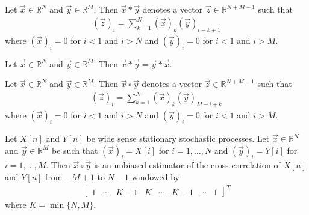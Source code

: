 \documentclass[a4paper, openany, oneside]{memoir}
\begin{document}
\begin{definition}[Convolution]
    Let $\vec{x} \in \mathbb{R}^N$ and $\vec{y} \in \mathbb{R}^M$. Then $\vec{x} \ast \vec{y}$ denotes a vector $\vec{z} \in \mathbb{R}^{N+M-1}$ such that
    \begin{align*}
        (\vec{z})_i = \sum_{k=1}^{N} (\vec{x})_k (\vec{y})_{i-k+1}
    \end{align*}
    where $(\vec{x})_i=0$ for $i < 1$ and $i > N$ and $(\vec{y})_i=0$ for $i < 1$ and $i > M$.
\end{definition}
\begin{theorem} \label{th:conv-comm}
    Let $\vec{x} \in \mathbb{R}^N$ and $\vec{y} \in \mathbb{R}^M$. Then $\vec{x} \ast \vec{y} = \vec{y} \ast \vec{x}$.
\end{theorem}
\begin{definition}
    Let $\vec{x} \in \mathbb{R}^N$ and $\vec{y} \in \mathbb{R}^M$. Then $\vec{x} \circ \vec{y}$ denotes a vector $\vec{z} \in \mathbb{R}^{N+M-1}$ such that
    \begin{align*}
        (\vec{z})_i = \sum_{k=1}^{N} (\vec{x})_k (\vec{y})_{M-i+k}
    \end{align*}
    where $(\vec{x})_i=0$ for $i < 1$ and $i > N$ and $(\vec{y})_i=0$ for $i < 1$ and $i > M$.
\end{definition}
\begin{theorem} \label{th:corr-unbiased}
    Let $X[n]$ and $Y[n]$ be wide sense stationary stochastic processes. Let $\vec{x} \in \mathbb{R}^N$ and $\vec{y} \in \mathbb{R}^M$ be such that $(\vec{x})_i = X[i]$ for $i=1,\ldots,N$ and $(\vec{y})_i = Y[i]$ for $i=1,\ldots,M$. Then $\vec{x} \circ \vec{y}$ is an unbiased estimator of the cross-correlation of $X[n]$ and $Y[n]$ from $-M+1$ to $N-1$ windowed by
    \begin{align*}
        \begin{bmatrix}
            1 & \cdots & K - 1 & K & \cdots & K - 1 & \cdots & 1
        \end{bmatrix}^T
    \end{align*}
    where $K = \min\{N,M\}$.
\end{theorem}
\end{document}
